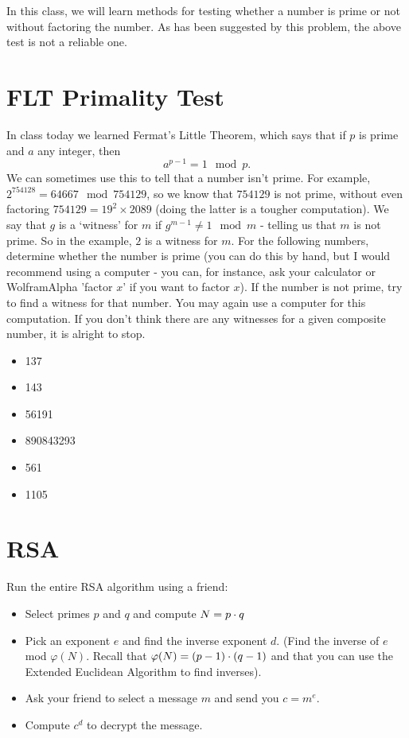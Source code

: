 \documentclass[12pt]{article}
\begin{document}
In this class, we will learn methods for testing whether a number is prime or not without factoring the number. As has been suggested by this problem, the above test is not a reliable one.

\section{FLT Primality Test}


In class today we learned Fermat's Little Theorem, which says that if $p$ is prime and $a$ any integer, then
$$a^{p-1} = 1 \mod p.$$
We can sometimes use this to tell that a number isn't prime. For example, $2^{754128} = 64667 \mod 754129$, so we know that $754129$ is not prime, without even factoring $754129 = 19^2 \times 2089$ (doing the latter is a tougher computation). We say that $g$ is a `witness' for $m$ if $g^{m-1} \neq 1 \mod m$ - telling us that $m$ is not prime. So in the example, $2$ is a witness for $m$. For the following numbers, determine whether the number is prime (you can do this by hand, but I would recommend using a computer - you can, for instance, ask your calculator or WolframAlpha 'factor $x$' if you want to factor $x$). If the number is not prime, try to find a witness for that number. You may again use a computer for this computation. If you don't think there are any witnesses for a given composite number, it is alright to stop.

\begin{itemize}
\item 137
\item 143
\item 56191
\item 890843293
\item 561
\item 1105
\end{itemize}


\section{RSA}

Run the entire RSA algorithm using a friend:

\begin{itemize}
\item Select primes $p$ and $q$ and compute $N = p \cdot q$
\item Pick an exponent $e$ and find the inverse exponent $d$. (Find the inverse of $e$ mod $ \varphi(N)$. Recall that $\varphi(N) = (p-1) \cdot (q-1)$ and that you can use the Extended Euclidean Algorithm to find inverses).
\item Ask your friend to select a message $m$ and send you $c = m^e$.
\item Compute $c^d$ to decrypt the message.
\end{itemize}
\end{document}
